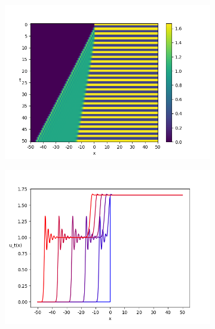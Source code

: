 \documentclass{article}
\theoremstyle{definition}
\numberwithin{equation}{section}
\begin{document}
\begin{figure}
  \centering
  \begin{subfigure}[b]{0.45\textwidth}
      \centering
      \includegraphics[width=\textwidth]{figures/fig2a.png}
      \caption{}
  \end{subfigure}
  \hfill
  \begin{subfigure}[b]{0.45\textwidth}
      \centering
      \includegraphics[width=\textwidth]{figures/fig2b.png}
      \caption{}
  \end{subfigure}
     \begin{subfigure}[b]{0.45\textwidth}
      \centering

\end{subfigure}
\end{figure}
\end{document}
